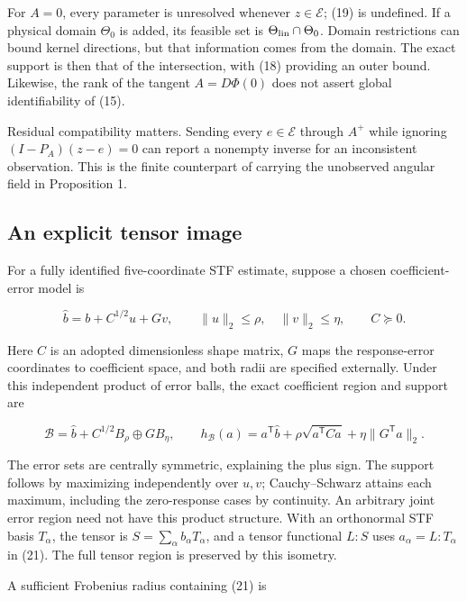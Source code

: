 \documentclass[aps,prd,reprint,onecolumn,11pt,nofootinbib,notitlepage]{revtex4-2}
\begin{document}
For \(A=0\), every parameter is unresolved whenever \(z\in\mathcal E\); (19) is undefined. If a physical domain \(\Theta_0\) is added, its feasible set is \(\Theta_{\rm lin}\cap\Theta_0\). Domain restrictions can bound kernel directions, but that information comes from the domain. The exact support is then that of the intersection, with (18) providing an outer bound. Likewise, the rank of the tangent \(A=D\Phi(0)\) does not assert global identifiability of (15).

Residual compatibility matters. Sending every \(e\in\mathcal E\) through \(A^+\) while ignoring \((I-P_A)(z-e)=0\) can report a nonempty inverse for an inconsistent observation. This is the finite counterpart of carrying the unobserved angular field in Proposition 1.

\subsection{An explicit tensor image}

For a fully identified five-coordinate STF estimate, suppose a chosen coefficient-error model is

\begin{equation}
 \widehat b=b+C^{1/2}u+Gv,\qquad
 \|u\|_2\le\rho,\quad \|v\|_2\le\eta,\qquad C\succeq0.\tag{20}
\end{equation}

Here \(C\) is an adopted dimensionless shape matrix, \(G\) maps the response-error coordinates to coefficient space, and both radii are specified externally. Under this independent product of error balls, the exact coefficient region and support are

\begin{equation}
 \mathcal B=\widehat b+C^{1/2}B_\rho\oplus GB_\eta,
 \qquad h_{\mathcal B}(a)=a^{\mathsf T}\widehat b
 +\rho\sqrt{a^{\mathsf T}Ca}+\eta\|G^{\mathsf T}a\|_2 .\tag{21}
\end{equation}

The error sets are centrally symmetric, explaining the plus sign. The support follows by maximizing independently over \(u,v\); Cauchy--Schwarz attains each maximum, including the zero-response cases by continuity. An arbitrary joint error region need not have this product structure. With an orthonormal STF basis \(T_\alpha\), the tensor is \(S=\sum_\alpha b_\alpha T_\alpha\), and a tensor functional \(L:S\) uses \(a_\alpha=L:T_\alpha\) in (21). The full tensor region is preserved by this isometry.

A sufficient Frobenius radius containing (21) is
\end{document}
